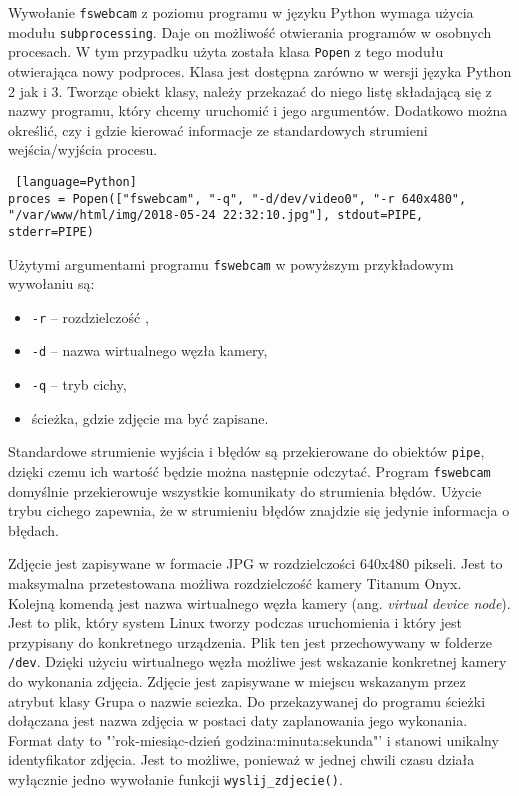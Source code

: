 \documentclass[a4paper,12pt,twoside]{article}
\begin{document}
Wywołanie \texttt{fswebcam} z poziomu programu w języku Python wymaga użycia modułu \texttt{subprocessing}. Daje on możliwość otwierania programów w osobnych procesach. W tym przypadku użyta została klasa \texttt{Popen} z tego modułu otwierająca nowy podproces. Klasa jest dostępna zarówno w wersji języka Python 2 jak i 3. Tworząc obiekt klasy, należy przekazać do niego listę składającą się z nazwy programu, który chcemy uruchomić i jego argumentów. Dodatkowo można określić, czy i gdzie kierować informacje ze standardowych strumieni wejścia/wyjścia procesu.

\begin{lstlisting} [language=Python]
proces = Popen(["fswebcam", "-q", "-d/dev/video0", "-r 640x480", "/var/www/html/img/2018-05-24 22:32:10.jpg"], stdout=PIPE, stderr=PIPE)
\end{lstlisting}

Użytymi argumentami programu \texttt{fswebcam} w powyższym przykładowym wywołaniu są:
\begin{itemize}
\item \texttt{-r} -- rozdzielczość , 
\item \texttt{-d} -- nazwa wirtualnego węzła kamery,
\item \texttt{-q} -- tryb cichy,
\item ścieżka, gdzie zdjęcie ma być zapisane.
\end{itemize}
Standardowe strumienie wyjścia i błędów są przekierowane do obiektów \texttt{pipe}, dzięki czemu ich wartość będzie można następnie odczytać. Program \texttt{fswebcam} domyślnie przekierowuje wszystkie komunikaty do strumienia błędów. Użycie trybu cichego zapewnia, że w strumieniu błędów znajdzie się jedynie informacja o błędach.

Zdjęcie jest zapisywane w formacie JPG w rozdzielczości 640x480 pikseli. Jest to maksymalna przetestowana możliwa rozdzielczość kamery Titanum Onyx. Kolejną komendą jest nazwa wirtualnego węzła kamery (ang. \textit{virtual device node}). Jest to plik, który system Linux tworzy podczas uruchomienia i który jest przypisany do konkretnego urządzenia. Plik ten jest przechowywany w folderze \texttt{/dev}. Dzięki użyciu wirtualnego węzła możliwe jest wskazanie konkretnej kamery do wykonania zdjęcia. Zdjęcie jest zapisywane w miejscu wskazanym przez atrybut klasy Grupa o nazwie sciezka. Do przekazywanej do programu ścieżki dołączana jest nazwa zdjęcia w postaci daty zaplanowania jego wykonania. Format daty to "'rok-miesiąc-dzień godzina:minuta:sekunda"' i stanowi unikalny identyfikator zdjęcia. Jest to możliwe, ponieważ w jednej chwili czasu działa wyłącznie jedno wywołanie funkcji \texttt{wyslij{\_}zdjecie()}.
\end{document}
